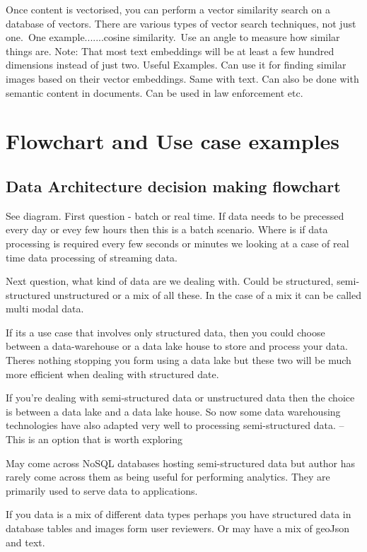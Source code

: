 \documentclass[a4paper, 11pt]{article}
\begin{document}
    Once content is vectorised, you can perform a vector similarity search on a database of vectors.
    There are various types of vector search techniques, not just one.\ One example.......cosine similarity.\ Use an angle to measure how similar things are.
    Note: That most text embeddings will be at least a few hundred dimensions instead of just two.
    Useful Examples.
    Can use it for finding similar images based on their vector embeddings.
    Same with text.
    Can also be done with semantic content in documents.
    Can be used in law enforcement etc.


    \section{Flowchart and Use case examples}

    \subsection{Data Architecture decision making flowchart}
    See diagram.
    First question - batch or real time.
    If data needs to be precessed every day or evey few hours then this is a batch scenario.
    Where is if data processing is required every few seconds or minutes we looking at a case of real time data processing of streaming data.

    Next question, what kind of data are we dealing with.
    Could be structured, semi-structured unstructured or a mix of all these.
    In the case of a mix it can be called multi modal data.

    If its a use case that involves only structured data, then you could choose between a data-warehouse or a data lake house to store and process your data.
    Theres nothing stopping you form using a data lake but these two will be much more efficient when dealing with structured date.

    If you're dealing with semi-structured data or unstructured data then the choice is between a data lake and a data lake house.
    So now some data warehousing technologies have also adapted very well to processing semi-structured data.
    -- This is an option that is worth exploring

    May come across NoSQL databases hosting semi-structured data but author has rarely come across them as being useful for performing analytics.
    They are primarily used to serve data to applications.

    If you data is a mix of different data types perhaps you have structured data in database tables and images form user reviewers.
    Or may have a mix of geoJson and text.
\end{document}
